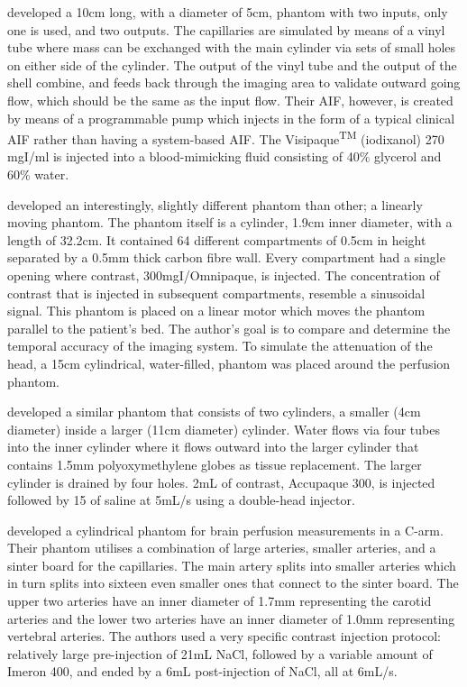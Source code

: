 \cite{driscoll2011development} developed a 10cm long, with a diameter of 5cm, phantom with two inputs, only one is used, and two outputs. The capillaries are simulated by means of a vinyl tube where mass can be exchanged with the main cylinder via sets of small holes on either side of the cylinder. The output of the vinyl tube and the output of the shell combine, and feeds back through the imaging area to validate outward going flow, which should be the same as the input flow. Their \ac{AIF}, however, is created by means of a programmable pump which injects in the form of a typical clinical \ac{AIF} rather than having a system-based \ac{AIF}. The Visipaque\textsuperscript{TM} (iodixanol) 270 mgI/ml is injected into a blood-mimicking fluid consisting of 40\% glycerol and 60\% water.

\cite{ganguly2012vitro} developed an interestingly, slightly different phantom than other;  a linearly moving phantom. The phantom itself is a cylinder, 1.9cm inner diameter, with a length of 32.2cm. It contained 64 different compartments of 0.5cm in height separated by a 0.5mm thick carbon fibre wall. Every compartment had a single opening where contrast, 300mgI/Omnipaque, is injected. The concentration of contrast that is injected in subsequent compartments, resemble a sinusoidal signal. This phantom is placed on a linear motor which moves the phantom parallel to the patient's bed. The author's goal is to compare and determine the temporal accuracy of the imaging system. To simulate the attenuation of the head, a 15cm cylindrical, water-filled, phantom was placed around the perfusion phantom. 

\cite{mathys2012phantom} developed a similar phantom that consists of two cylinders, a smaller (4cm diameter) inside a larger (11cm diameter) cylinder. Water flows via four tubes into the inner cylinder where it flows outward into the larger cylinder that contains 1.5mm polyoxymethylene globes as tissue replacement. The larger cylinder is drained by four holes. 2mL of contrast, Accupaque 300, is injected followed by 15 of saline at 5mL/s using a double-head injector.

\cite{boese2013performance} developed a cylindrical phantom for brain perfusion measurements in a C-arm. Their phantom utilises a combination of large arteries, smaller arteries, and a sinter board for the capillaries. The main artery splits into smaller arteries which in turn splits into sixteen even smaller ones that connect to the sinter board. The upper two arteries have an inner diameter of 1.7mm representing the carotid arteries and the lower two arteries have an inner diameter of 1.0mm representing vertebral arteries. The authors used a very specific contrast injection protocol: relatively large pre-injection of 21mL NaCl, followed by a variable amount of Imeron 400, and ended by a 6mL post-injection of NaCl, all at 6mL/s.


